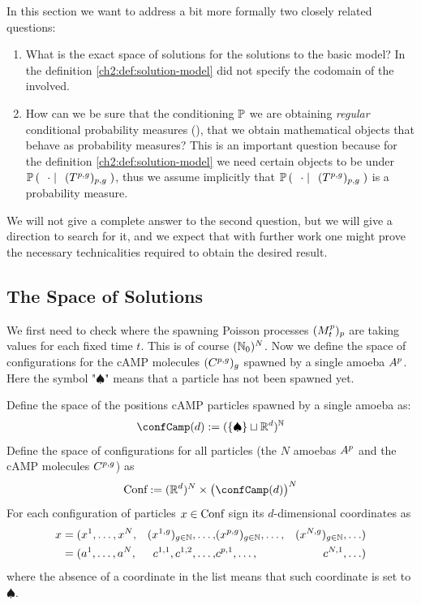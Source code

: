 In this section we want to address a bit more formally two closely related questions:
\begin{enumerate}
	\item What is the exact space of solutions for the solutions to the basic model? In the definition \ref{ch2:def:solution-model} did not specify the codomain of the \rv involved.
	\item How can we be sure that the conditioning $\mathbb{P}$ we are obtaining \emph{regular} conditional probability measures (\cite[Chapter 10.2,first definition]{dudley}), \ie that we obtain mathematical objects that behave as probability measures?
	This is an important question because for the definition \ref{ch2:def:solution-model} we need certain objects to be \Bm under $\mathbb{P} \left( \; \left. \; \cdot \; \right| \; \;(T^{p,g})_{p,g}  \; \right)$, thus we assume implicitly that $\mathbb{P} \left( \; \left. \; \cdot \; \right| \; \;(T^{p,g})_{p,g}  \; \right)$ is a probability measure.
\end{enumerate}

We will not give a complete answer to the second question, but we will give a direction to search for it, and we expect that with further work one might prove the necessary technicalities required to obtain the desired result.

\subsection{The Space of Solutions}\label{app:formal-def-solution}

We first need to check where the spawning Poisson processes $(M_t^p)_p$ are taking values for each fixed time $t$.
This is of course $(\mathbb{N}_0)^N$.
Now we define the space of configurations for the cAMP molecules $(C^{p,g})_g$ spawned by a single amoeba $A^p$.
Here the symbol "$\spadesuit$" means that a particle has not been spawned yet.

\begin{definition}
Define the space of the positions cAMP particles spawned by a single amoeba as:
\begin{equation*}
\confCamp(d):= (\{\spadesuit\} \sqcup \R^d)^\N
\end{equation*}
Define the space of configurations for all particles (the $N$ amoebas $A^p$ and the cAMP molecules $C^{p,g}$) as
\begin{equation*}
\Conf:=(\R^d)^N \times\big(\confCamp(d)\big)^N
\end{equation*}
For each configuration of particles $x\in \text{Conf}$ sign its $d$-dimensional coordinates as 
\begin{equation*}
\begin{aligned}
x &= (x^1, \ldots, x^N, 
	&(x^{1,g})_{g\in\mathbb{N}}, \ldots, 
	&(x^{p,g})_{g\in\mathbb{N}}, \ldots, 
	&(x^{N,g})_{g\in\mathbb{N}},\ldots)
\\
&= (a^1, \ldots, a^N, 
	&c^{1,1}, c^{1,2}, \ldots, 
	&c^{p,1},\ldots, 
	&c^{N,1}, \ldots)
\end{aligned}
\end{equation*}
where the absence of a coordinate in the list means that such coordinate is set to $\spadesuit$.
\end{definition}


